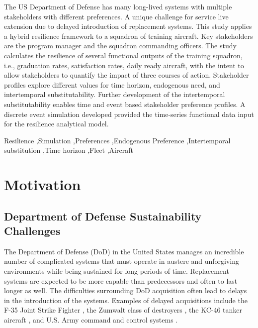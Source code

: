 \documentclass[preprint,12pt]{elsarticle}
\begin{document}
\begin{frontmatter}
\begin{abstract}
\end{abstract}
The US Department of Defense has many long-lived  systems with
multiple stakeholders with different preferences. A unique challenge
for service live extension due to delayed introduction of replacement
systems.
This study applies a hybrid resilience framework to a squadron of
training aircraft. Key stakeholders are the program manager and the
squadron commanding officers. The study calculates the resilience of
several functional outputs of the training squadron, i.e., graduation rates,
satisfaction rates, daily ready 
aircraft,  with the intent to allow stakeholders to quantify the
impact of three courses of action. Stakeholder profiles explore
different values for time horizon, endogenous need, and intertemporal
substitutability. Further development of the
intertemporal substitutability enables time and
event based stakeholder preference profiles. A discrete event
simulation developed provided the time-series functional data input
for the resilience analytical model.  

\begin{keyword}
Resilience \sep Simulation \sep Preferences \sep Endogenous Preference
\sep Intertemporal substitution \sep Time horizon \sep Fleet \sep Aircraft


\end{keyword}

\end{frontmatter}

\linenumbers

\section{Motivation}
\label{S:1}

\subsection{Department of Defense Sustainability Challenges}

The Department of Defense (DoD) in the United States manages an
incredible number of complicated systems that must operate in austere
and unforgiving environments while being sustained for long periods of
time. Replacement systems are expected to be more capable than
predecessors and often to last longer as well. The difficulties
surrounding DoD acquisition often lead to delays in 
the introduction of the systems. Examples of delayed acquisitions
include the F-35 Joint Strike Fighter
\cite{Werner2018}, the Zumwalt class of destroyers \cite{Katz2018},
% 
% 
the KC-46 tanker aircraft \cite{Mehta2016}, and U.S. Army command and
control systems \citep{Edwards2017}.
\end{document}
